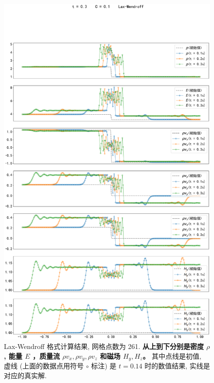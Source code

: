 \documentclass[10.5pt
]{article}
\begin{document}
\begin{figure}[htpb]
	\centering
	\includegraphics[width=\textwidth]{figures/init2.pdf}
	\caption{Lax-Wendroff 格式计算结果, 网格点数为 261. \textbf{从上到下分别是密度 $\rho$, 能量 $E$ ，质量流 $\rho v_x, \rho v_y, \rho v_z$ 和磁场 $H_y, H_z$。}
	其中点线是初值, 虚线 (上面的数据点用符号 $\circ$ 标注) 是 $t=0.14$ 时的数值结果, 实线是对应的真实解.}
	\label{fig:lax_wendroff2}
\end{figure}
\end{document}
